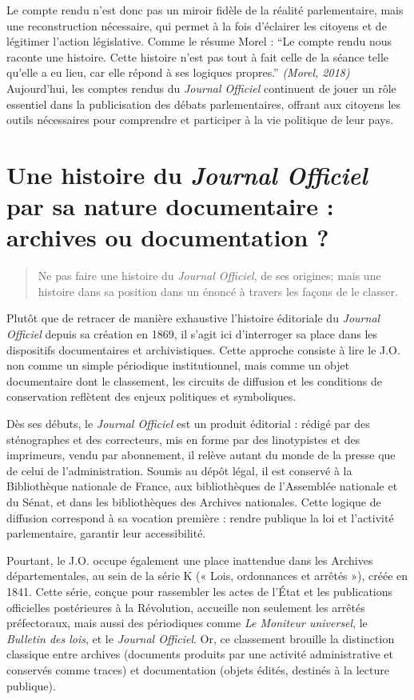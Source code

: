 Le compte rendu n’est donc pas un miroir fidèle de la réalité parlementaire, mais une reconstruction nécessaire, qui permet à la fois d’éclairer les citoyens et de légitimer l’action législative. Comme le résume Morel : \enquote{Le compte rendu nous raconte une histoire. Cette histoire n’est pas tout à fait celle de la séance telle qu’elle a eu lieu, car elle répond à ses logiques propres.} \emph{(Morel, 2018)} Aujourd'hui, les comptes rendus du \emph{Journal Officiel} continuent de jouer un rôle essentiel dans la publicisation des débats parlementaires, offrant aux citoyens les outils nécessaires pour comprendre et participer à la vie politique de leur pays.

\section{Une histoire du \emph{Journal Officiel} par sa nature documentaire : archives ou documentation ?}

\begin{quote}
Ne pas faire une histoire du \emph{Journal Officiel}, de ses origines; mais une histoire dans sa position dans un énoncé à travers les façons de le classer.

\end{quote}
Plutôt que de retracer de manière exhaustive l’histoire éditoriale du \emph{Journal Officiel} depuis sa création en 1869, il s’agit ici d’interroger sa place dans les dispositifs documentaires et archivistiques. Cette approche consiste à lire le J.O. non comme un simple périodique institutionnel, mais comme un objet documentaire dont le classement, les circuits de diffusion et les conditions de conservation reflètent des enjeux politiques et symboliques.

Dès ses débuts, le \emph{Journal Officiel} est un produit éditorial : rédigé par des sténographes et des correcteurs, mis en forme par des linotypistes et des imprimeurs, vendu par abonnement, il relève autant du monde de la presse que de celui de l’administration. Soumis au dépôt légal, il est conservé à la Bibliothèque nationale de France, aux bibliothèques de l’Assemblée nationale et du Sénat, et dans les bibliothèques des Archives nationales. Cette logique de diffusion correspond à sa vocation première : rendre publique la loi et l’activité parlementaire, garantir leur accessibilité.

Pourtant, le J.O. occupe également une place inattendue dans les Archives départementales, au sein de la série K (« Lois, ordonnances et arrêtés »), créée en 1841. Cette série, conçue pour rassembler les actes de l’État et les publications officielles postérieures à la Révolution, accueille non seulement les arrêtés préfectoraux, mais aussi des périodiques comme \emph{Le Moniteur universel}, le \emph{Bulletin des lois}, et le \emph{Journal Officiel}. Or, ce classement brouille la distinction classique entre archives (documents produits par une activité administrative et conservés comme traces) et documentation (objets édités, destinés à la lecture publique).

